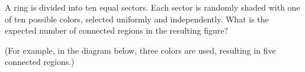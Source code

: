 A ring is divided into ten equal sectors. Each sector is randomly shaded with one of ten possible colors, selected uniformly and independently. What is the expected number of connected regions in the resulting figure?

(For example, in the diagram below, three colors are used, resulting in five connected regions.)
